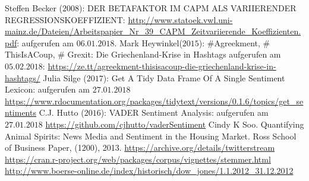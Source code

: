 
	\newpage
	\begin{thebibliography}{12345678}	
	 Steffen Becker ($2008$): DER BETAFAKTOR IM CAPM ALS VARIIERENDER REGRESSIONSKOEFFIZIENT: \url{http://www.statoek.vwl.uni-mainz.de/Dateien/Arbeitspapier_Nr_39_CAPM_Zeitvariierende_Koeffizienten.pdf}: aufgerufen am $06.01.2018$.
	 Mark Heywinkel($2015$): \#Agreekment, \# ThisIsACoup, \# Grexit: Die Griechenland-Krise in Hashtags
	aufgerufen am $05.02.2018$:  \url{https://ze.tt/agreekment-thisisacoup-die-griechenland-krise-in-hashtags/}
	 Julia Silge ($2017$): Get A Tidy Data Frame Of A Single Sentiment Lexicon: aufgerufen am $27.01.2018$ \url{https://www.rdocumentation.org/packages/tidytext/versions/0.1.6/topics/get_sentiments}
	 C.J. Hutto ($2016$): VADER Sentiment Analysis: aufgerufen am $27.01.2018$ \url{https://github.com/cjhutto/vaderSentiment}
	 Cindy K Soo. Quantifying Animal Spirits: News Media and Sentiment in the Housing Market. Ross School of Business Paper, (1200), 2013.
	 \url{https://archive.org/details/twitterstream}
	 \url{https://cran.r-project.org/web/packages/corpus/vignettes/stemmer.html}
	 \url{http://www.boerse-online.de/index/historisch/dow_jones/1.1.2012_31.12.2012}
\end{thebibliography}
\clearpage